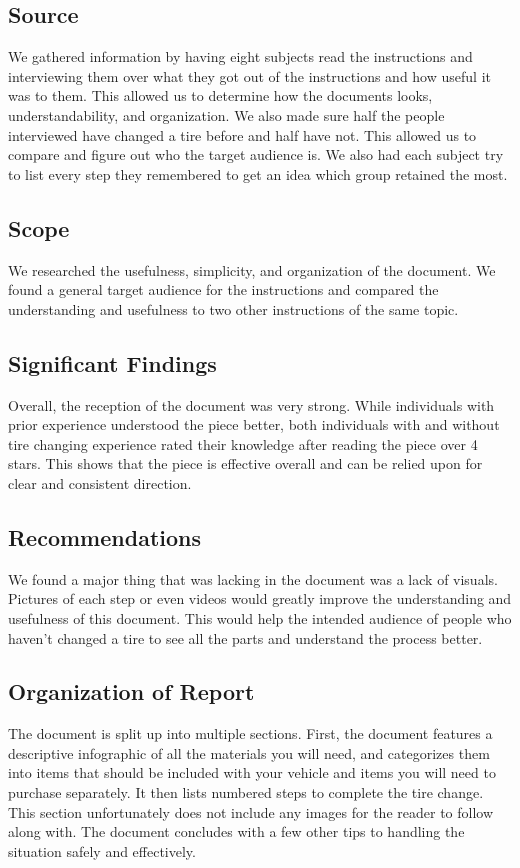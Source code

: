 \documentclass[12pt,A4paper]{article}
\begin{document}
		\subsection{Source}
		We gathered information by having eight subjects read the instructions and interviewing them over what they got out of the instructions and how useful it was to them. This allowed us to determine how the documents looks, understandability, and organization. We also made sure half the people interviewed have changed a tire before and half have not. This allowed us to compare and figure out who the target audience is. We also had each subject try to list every step they remembered to get an idea which group retained the most.

		\subsection{Scope}
		We researched the usefulness, simplicity, and organization of the document. We found a general target audience for the instructions and compared the understanding and usefulness to two other instructions of the same topic.

		\subsection{Significant Findings}
		Overall, the reception of the document was very strong. While individuals with prior experience understood the piece better, both individuals with and without tire changing experience rated their knowledge after reading the piece over 4 stars. This shows that the piece is effective overall and can be relied upon for clear and consistent direction.

		\subsection{Recommendations}
		We found a major thing that was lacking in the document was a lack of visuals. Pictures of each step or even videos would greatly improve the understanding and usefulness of this document. This would help the intended audience of people who haven't changed a tire to see all the parts and understand the process better.

		\subsection{Organization of Report}
		The document is split up into multiple sections. First, the document features a descriptive infographic of all the materials you will need, and categorizes them into items that should be included with your vehicle and items you will need to purchase separately. It then lists numbered steps to complete the tire change. This section unfortunately does not include any images for the reader to follow along with. The document concludes with a few other tips to handling the situation safely and effectively.
\end{document}
